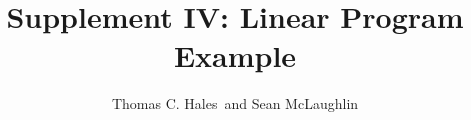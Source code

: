 \documentclass{article} %
\begin{document}
\title{Supplement IV: Linear Program Example}
\author{Thomas C. Hales\ and Sean McLaughlin}
\date{}
\maketitle

\begin{alltt} 

\end{alltt} 
\end{document}
